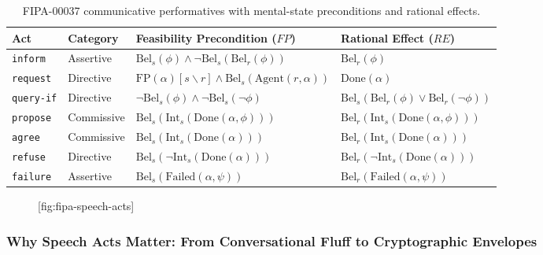 \begin{table}[H]
\centering
\footnotesize
\setlength{\tabcolsep}{3pt}
\begin{tabularx}{\textwidth}{l l >{\raggedright\arraybackslash}X >{\raggedright\arraybackslash}X}
\toprule
\textbf{Act} & \textbf{Category} & \textbf{Feasibility Precondition ($FP$)} & \textbf{Rational Effect ($RE$)} \\
\midrule
\texttt{inform} & Assertive & $\mathrm{Bel}_s(\phi) \land \neg\mathrm{Bel}_s(\mathrm{Bel}_r(\phi))$ & $\mathrm{Bel}_r(\phi)$ \\
\texttt{request} & Directive & $\mathrm{FP}(\alpha)[s\backslash r] \land \mathrm{Bel}_s(\mathrm{Agent}(r, \alpha))$ & $\mathrm{Done}(\alpha)$ \\
\texttt{query-if} & Directive & $\neg\mathrm{Bel}_s(\phi) \land \neg\mathrm{Bel}_s(\neg\phi)$ & $\mathrm{Bel}_s(\mathrm{Bel}_r(\phi) \lor \mathrm{Bel}_r(\neg\phi))$ \\
\texttt{propose} & Commissive & $\mathrm{Bel}_s(\mathrm{Int}_s(\mathrm{Done}(\alpha, \phi)))$ & $\mathrm{Bel}_r(\mathrm{Int}_s(\mathrm{Done}(\alpha, \phi)))$ \\
\texttt{agree} & Commissive & $\mathrm{Bel}_s(\mathrm{Int}_s(\mathrm{Done}(\alpha)))$ & $\mathrm{Bel}_r(\mathrm{Int}_s(\mathrm{Done}(\alpha)))$ \\
\texttt{refuse} & Directive & $\mathrm{Bel}_s(\neg\mathrm{Int}_s(\mathrm{Done}(\alpha)))$ & $\mathrm{Bel}_r(\neg\mathrm{Int}_s(\mathrm{Done}(\alpha)))$ \\
\texttt{failure} & Assertive & $\mathrm{Bel}_s(\mathrm{Failed}(\alpha, \psi))$ & $\mathrm{Bel}_r(\mathrm{Failed}(\alpha, \psi))$ \\
\bottomrule
\end{tabularx}
\caption{FIPA-00037 communicative performatives with mental-state preconditions and rational effects.}
\label{tab:fipa-performatives}
\end{table}

\begin{figure}[tp]
  \centering
  [fig:fipa-speech-acts]
\end{figure}

\subsubsection{Why Speech Acts Matter: From Conversational Fluff to Cryptographic Envelopes}
\label{sec:why-fipa-matters}

